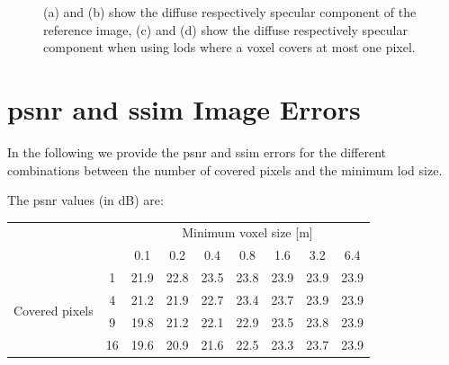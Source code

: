 \begin{figure}[ht]
\begin{subfigure}[b]{0.49\linewidth}
        \caption{}
    \end{subfigure}
    \caption[Diffuse and specular components rendered seperately]{(a) and (b) show the diffuse respectively specular component of the reference image, (c) and (d) show the diffuse respectively specular component when using \acsp{lod} where a voxel covers at most one pixel.}
	\label{fig:diffuse_specular_breakdown}
\end{figure}

\section{\acs{psnr} and \acs{ssim} Image Errors}
\label{sec:psnr_and_ssim_errors}
In the following we provide the \ac{psnr} and \ac{ssim} errors for the different combinations between the number of covered pixels and the minimum \ac{lod} size.

The \ac{psnr} values (in dB) are:
\begin{center}
    \begin{tabular}{| c | c | c | c | c | c | c | c | c |}
        \cline{3-9}
        \multicolumn{2}{c|}{} & \multicolumn{7}{c|}{Minimum voxel size [m]} \\
        \cline{3-9}
        \multicolumn{2}{c|}{} & 0.1 & 0.2 & 0.4 & 0.8 & 1.6 & 3.2 & 6.4 \\
        \hline
        \multirow{4}{*}{Covered pixels}& 1 & 21.9 & 22.8 & 23.5 & 23.8 & 23.9 & 23.9 & 23.9 \\
        \cline{2-9}
        & 4 & 21.2 & 21.9 & 22.7 & 23.4 & 23.7 & 23.9 & 23.9 \\
        \cline{2-9}
        & 9 & 19.8 & 21.2 & 22.1 & 22.9 & 23.5 & 23.8 & 23.9 \\
        \cline{2-9}
        & 16 & 19.6 & 20.9 & 21.6 & 22.5 & 23.3 & 23.7 & 23.9 \\
        \hline
    \end{tabular}
\end{center}

